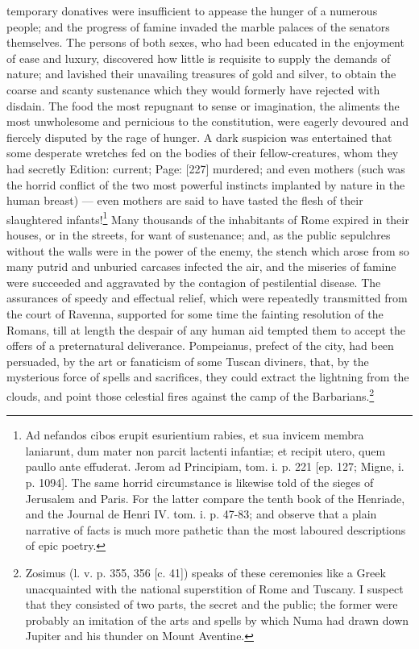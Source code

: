 temporary donatives were insufficient to appease the hunger of a numerous people; and the progress of famine invaded the marble palaces of the senators themselves. The persons of both sexes, who had been educated in the enjoyment of ease and luxury, discovered how little is requisite to supply the demands of nature; and lavished their unavailing treasures of gold and silver, to obtain the coarse and scanty sustenance which they would formerly have rejected with disdain. The food the most repugnant to sense or imagination, the aliments the most unwholesome and pernicious to the constitution, were eagerly devoured and fiercely disputed by the rage of hunger. A dark suspicion was entertained that some desperate wretches fed on the bodies of their fellow-creatures, whom they had secretly Edition: current; Page: [227] murdered; and even mothers (such was the horrid conflict of the two most powerful instincts implanted by nature in the human breast) \texthebrew{—} even mothers are said to have tasted the flesh of their slaughtered infants!\footnote{Ad nefandos cibos erupit esurientium rabies, et sua invicem membra laniarunt, dum mater non parcit lactenti infantiæ; et recipit utero, quem paullo ante effuderat. Jerom ad Principiam, tom. i. p. 221 [ep. 127; Migne, i. p. 1094]. The same horrid circumstance is likewise told of the sieges of Jerusalem and Paris. For the latter compare the tenth book of the Henriade, and the Journal de Henri IV. tom. i. p. 47-83; and observe that a plain narrative of facts is much more pathetic than the most laboured descriptions of epic poetry.} Many thousands of the inhabitants of Rome expired in their houses, or in the streets, for want of sustenance; and, as the public sepulchres without the walls were in the power of the enemy, the stench which arose from so many putrid and unburied carcases infected the air, and the miseries of famine were succeeded and aggravated by the contagion of pestilential disease. The assurances of speedy and effectual relief, which were repeatedly transmitted from the court of Ravenna, supported for some time the fainting resolution of the Romans, till at length the despair of any human aid tempted them to accept the offers of a preternatural deliverance. Pompeianus, prefect of the city, had been persuaded, by the art or fanaticism of some Tuscan diviners, that, by the mysterious force of spells and sacrifices, they could extract the lightning from the clouds, and point those celestial fires against the camp of the Barbarians.\footnote{Zosimus (l. v. p. 355, 356 [c. 41]) speaks of these ceremonies like a Greek unacquainted with the national superstition of Rome and Tuscany. I suspect that they consisted of two parts, the secret and the public; the former were probably an imitation of the arts and spells by which Numa had drawn down Jupiter and his thunder on Mount Aventine.

}
